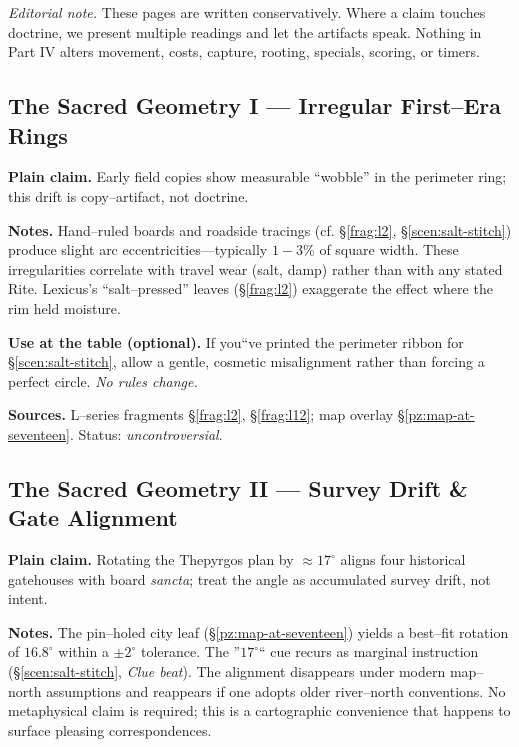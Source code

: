 \documentclass[11pt]{article}
\numberwithin{equation}{section} %
\theoremstyle{plain} %
\theoremstyle{definition} %
\theoremstyle{remark} %
\begin{document}
\medskip
\noindent\textit{Editorial note.} These pages are written conservatively. Where a claim touches doctrine, we present multiple readings and let the artifacts speak. Nothing in Part IV alters movement, costs, capture, rooting, specials, scoring, or timers.

\subsection{The Sacred Geometry I --- Irregular First--Era Rings}
\label{geometry:irregular-rings}

\noindent\textbf{Plain claim.} Early field copies show measurable ``wobble'' in the perimeter ring; this drift is copy--artifact, not doctrine.

\medskip
\noindent\textbf{Notes.} Hand--ruled boards and roadside tracings (cf. \S\ref{frag:l2}, \S\ref{scen:salt-stitch}) produce slight arc eccentricities---typically \(1\!-\!3\%\) of square width. These irregularities correlate with travel wear (salt, damp) rather than with any stated Rite. Lexicus's ``salt--pressed'' leaves (\S\ref{frag:l2}) exaggerate the effect where the rim held moisture.

\medskip
\noindent\textbf{Use at the table (optional).} If you``ve printed the perimeter ribbon for \S\ref{scen:salt-stitch}, allow a gentle, cosmetic misalignment rather than forcing a perfect circle. \emph{No rules change.}

\medskip
\noindent\textbf{Sources.} L--series fragments \S\ref{frag:l2}, \S\ref{frag:l12}; map overlay \S\ref{pz:map-at-seventeen}. Status: \emph{uncontroversial}.

\subsection{The Sacred Geometry II --- Survey Drift \& Gate Alignment}
\label{geometry:survey-drift}

\noindent\textbf{Plain claim.} Rotating the Thepyrgos plan by \(\approx 17^\circ\) aligns four historical gatehouses with board \emph{sancta}; treat the angle as accumulated survey drift, not intent.

\medskip
\noindent\textbf{Notes.} The pin--holed city leaf (\S\ref{pz:map-at-seventeen}) yields a best--fit rotation of \(16.8^\circ\) within a \(\pm 2^\circ\) tolerance. The ''\(17^\circ\)`` cue recurs as marginal instruction (\S\ref{scen:salt-stitch}, \emph{Clue beat}). The alignment disappears under modern map--north assumptions and reappears if one adopts older river--north conventions. No metaphysical claim is required; this is a cartographic convenience that happens to surface pleasing correspondences.
\end{document}
